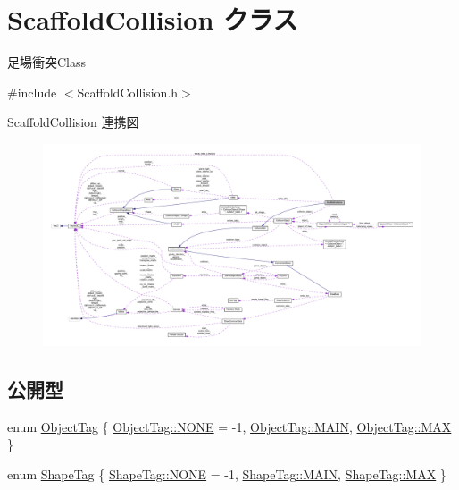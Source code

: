 \hypertarget{class_scaffold_collision}{}\section{Scaffold\+Collision クラス}
\label{class_scaffold_collision}


足場衝突\+Class  




{\ttfamily \#include $<$Scaffold\+Collision.\+h$>$}



Scaffold\+Collision 連携図\nopagebreak
\begin{figure}[H]
\begin{center}
\leavevmode
\includegraphics[width=350pt]{class_scaffold_collision__coll__graph}
\end{center}
\end{figure}
\subsection*{公開型}
\begin{DoxyCompactItemize}
\item 
enum \mbox{\hyperlink{class_scaffold_collision_a6fadd848bbcba4c102f93047214a8492}{Object\+Tag}} \{ \mbox{\hyperlink{class_scaffold_collision_a6fadd848bbcba4c102f93047214a8492ab50339a10e1de285ac99d4c3990b8693}{Object\+Tag\+::\+N\+O\+NE}} = -\/1, 
\mbox{\hyperlink{class_scaffold_collision_a6fadd848bbcba4c102f93047214a8492a186495f7da296bf880df3a22a492b378}{Object\+Tag\+::\+M\+A\+IN}}, 
\mbox{\hyperlink{class_scaffold_collision_a6fadd848bbcba4c102f93047214a8492a26a4b44a837bf97b972628509912b4a5}{Object\+Tag\+::\+M\+AX}}
 \}
\item 
enum \mbox{\hyperlink{class_scaffold_collision_afba832e3de37d3177522a381af3d75e6}{Shape\+Tag}} \{ \mbox{\hyperlink{class_scaffold_collision_afba832e3de37d3177522a381af3d75e6ab50339a10e1de285ac99d4c3990b8693}{Shape\+Tag\+::\+N\+O\+NE}} = -\/1, 
\mbox{\hyperlink{class_scaffold_collision_afba832e3de37d3177522a381af3d75e6a186495f7da296bf880df3a22a492b378}{Shape\+Tag\+::\+M\+A\+IN}}, 
\mbox{\hyperlink{class_scaffold_collision_afba832e3de37d3177522a381af3d75e6a26a4b44a837bf97b972628509912b4a5}{Shape\+Tag\+::\+M\+AX}}
 \}
\end{DoxyCompactItemize}
